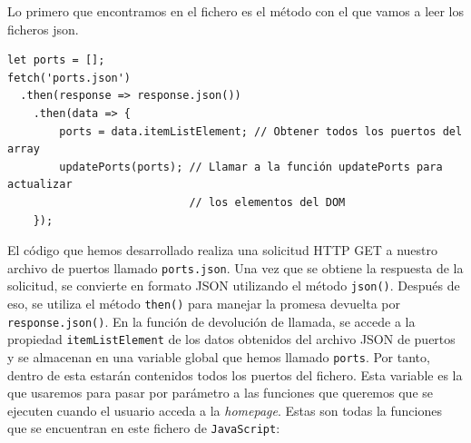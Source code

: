 \documentclass{article}
\begin{document}
\noindent Lo primero que encontramos en el fichero es el método con el que vamos a leer los ficheros json.
\begin{verbatim}
let ports = [];
fetch('ports.json')
  .then(response => response.json())
    .then(data => {
        ports = data.itemListElement; // Obtener todos los puertos del array
        updatePorts(ports); // Llamar a la función updatePorts para actualizar
                            // los elementos del DOM
    });
\end{verbatim}
El código que hemos desarrollado realiza una solicitud HTTP GET a nuestro archivo de puertos llamado \texttt{ports.json}. Una vez que se obtiene la respuesta de la solicitud, se convierte en formato JSON utilizando el método \texttt{json()}. Después de eso, se utiliza el método \texttt{then()} para manejar la promesa devuelta por \texttt{response.json()}. En la función de devolución de llamada, se accede a la propiedad \texttt{itemListElement} de los datos obtenidos del archivo JSON de puertos y se almacenan en una variable global que hemos llamado \texttt{ports}. Por tanto, dentro de esta estarán contenidos todos los puertos del fichero. Esta variable es la que usaremos para pasar por parámetro a las funciones que queremos que se ejecuten cuando el usuario acceda a la \textit{homepage}. Estas son todas la funciones que se encuentran en este fichero de \texttt{JavaScript}:
\end{document}
